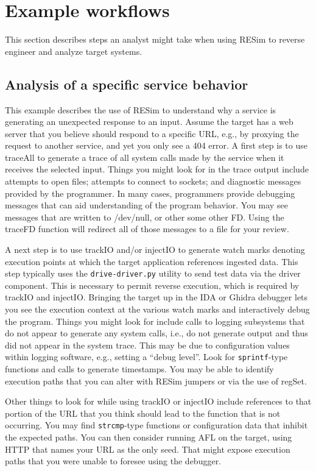\documentclass[titlepage]{article}
\begin{document}
\section{Example workflows}
\label{example-workflows}
This section describes steps an analyst might take when using RESim to reverse engineer and analyze target systems.

\subsection{Analysis of a specific service behavior}
This example describes the use of RESim to understand why a service is generating an unexpected response to an input.  Assume the target has
a web server that you believe should respond to a specific URL, e.g., by proxying the request to another service, and yet you only see a 404 error.
A first step is to use traceAll to generate a trace of all system calls made by the service when it receives the selected input.  Things you might
look for in the trace output include attempts to open files; attempts to connect to sockets; and diagnostic messages provided by the programmer.
In many cases, programmers provide debugging messages that can aid understanding of the program behavior.  You may see messages that are written
to /dev/null, or other some other FD.  Using the traceFD function will redirect all of those messages to a file for your review.  

A next step is to use trackIO and/or injectIO to generate watch marks denoting execution points at which the target application references
ingested data.  This step typically uses the {\tt drive-driver.py} utility to send test data via the driver component.  This is necessary to 
permit reverse execution, which is required by trackIO and injectIO.  Bringing the target up in the IDA or Ghidra debugger lets you see the execution
context at the various watch marks and interactively debug the program.  Things you might look for include calls to logging subsystems that do
not appear to generate any system calls, i.e., do not generate output and thus did not appear in the system trace.  This may be due to configuration 
values within logging software, e.g., setting a ``debug level''.  Look for {\tt sprintf}-type functions
and calls to generate timestamps.  You may be able to identify execution paths that you can alter with RESim jumpers or via the use of regSet.

Other things to look for while using trackIO or injectIO include references to that portion of the URL that you think should lead to the function that is
not occurring.  You may find {\tt strcmp}-type functions or configuration data that inhibit the expected paths.  You can then consider running AFL on the
target, using HTTP that names your URL as the only seed.  That might expose execution paths that you were unable to foresee using the debugger.
\end{document}

